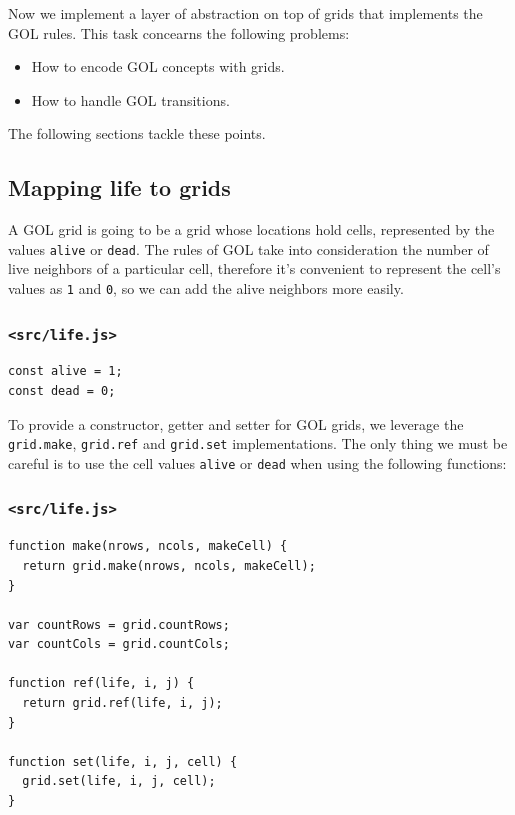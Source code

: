\documentclass[11pt]{article}
\begin{document}
Now we implement a layer of abstraction on top of grids that implements the GOL rules. This task concearns the following problems:
\begin{itemize}
\item How to encode GOL concepts with grids.
\item How to handle GOL transitions.
\end{itemize}

The following sections tackle these points.

\subsection{Mapping life to grids}
\label{sec:orgd838108}

A GOL grid is going to be a grid whose locations hold cells, represented by the values \texttt{alive} or \texttt{dead}. The rules of GOL take into consideration the number of live neighbors of a particular cell, therefore it's convenient to represent the cell's values as \texttt{1} and \texttt{0}, so we can add the alive neighbors more easily.

\subsubsection*{\texttt{<src/life.js>}}
\label{sec:orgb36fe58}
\begin{verbatim}
const alive = 1;
const dead = 0;
\end{verbatim}

To provide a constructor, getter and setter for GOL grids, we leverage the \texttt{grid.make}, \texttt{grid.ref} and \texttt{grid.set} implementations. The only thing we must be careful is to use the cell values \texttt{alive} or \texttt{dead} when using the following functions:

\subsubsection*{\texttt{<src/life.js>}}
\label{sec:org09e2266}
\begin{verbatim}
function make(nrows, ncols, makeCell) {
  return grid.make(nrows, ncols, makeCell);
}

var countRows = grid.countRows;
var countCols = grid.countCols;

function ref(life, i, j) {
  return grid.ref(life, i, j);
}

function set(life, i, j, cell) {
  grid.set(life, i, j, cell);
}
\end{verbatim}
\end{document}
